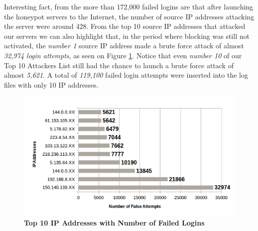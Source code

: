 \documentclass[conference]{IEEEtran}
\begin{document}
Interesting fact, from the more than 172,000 failed logins are that after launching the honeypot servers to the Internet, the number of source IP addresses attacking the server were around 428. From the top 10 source IP addresses that attacked our servers we can also highlight that, in the period where blocking was still not activated, the \emph{number 1} source IP address made a brute force attack of almost \emph{32,974 login attempts}, as seen on Figure \ref{loginattempts2}. Notice that even \emph{number 10} of our Top 10 Attackers List still had the chance to launch a brute force attack of almost \emph{5,621}. A total of \emph{119,100} failed login attempts were inserted into the log files with only 10 IP addresses. 
\begin{figure}[h!]
\caption{\textbf{Top 10 IP Addresses with Number of Failed Logins}}
\label{loginattempts2}
\centering
\includegraphics[scale=0.40]{false-attempts-per-ip.png}
\end{figure}
\end{document}
